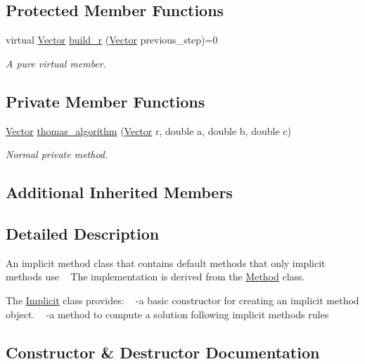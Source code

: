 \subsection*{Protected Member Functions}
\begin{DoxyCompactItemize}
\item 
virtual \hyperlink{classVector}{Vector} \hyperlink{classImplicit_ab2d07b5185008b2c845a31a03350d98d}{build\+\_\+r} (\hyperlink{classVector}{Vector} previous\+\_\+step)=0
\begin{DoxyCompactList}\small\item\em A pure virtual member. \end{DoxyCompactList}\end{DoxyCompactItemize}
\subsection*{Private Member Functions}
\begin{DoxyCompactItemize}
\item 
\hyperlink{classVector}{Vector} \hyperlink{classImplicit_a095e8555a718b53ff94770a0a220dfba}{thomas\+\_\+algorithm} (\hyperlink{classVector}{Vector} r, double a, double b, double c)
\begin{DoxyCompactList}\small\item\em Normal private method. \end{DoxyCompactList}\end{DoxyCompactItemize}
\subsection*{Additional Inherited Members}


\subsection{Detailed Description}
An implicit method class that contains default methods that only implicit methods use ~\newline
 The implementation is derived from the \hyperlink{classMethod}{Method} class. 

The \hyperlink{classImplicit}{Implicit} class provides\+: ~\newline
-\/a basic constructor for creating an implicit method object. ~\newline
-\/a method to compute a solution following implicit methods rules 

\subsection{Constructor \& Destructor Documentation}
